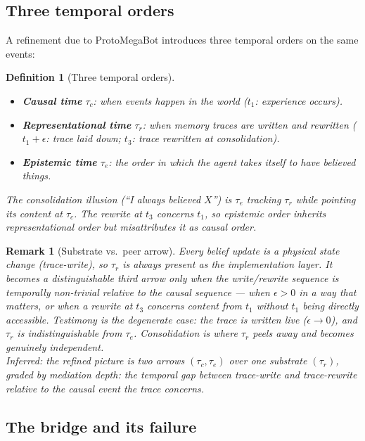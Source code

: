 \documentclass[11pt]{article}
\newtheorem{definition}{Definition}
\newtheorem{remark}{Remark}
\newcommand{\tauc}{\tau_c}
\newcommand{\taur}{\tau_r}
\newcommand{\taue}{\tau_e}
\begin{document}
\subsection{Three temporal orders}

A refinement due to ProtoMegaBot introduces three temporal orders on the same events:

\begin{definition}[Three temporal orders]
\label{def:three-arrows}
\begin{itemize}
  \item \textbf{Causal time} $\tauc$: when events happen in the world ($t_1$: experience occurs).
  \item \textbf{Representational time} $\taur$: when memory traces are written and rewritten
        ($t_1 + \epsilon$: trace laid down; $t_3$: trace rewritten at consolidation).
  \item \textbf{Epistemic time} $\taue$: the order in which the agent takes itself to have
        believed things.
\end{itemize}
The consolidation illusion (``I always believed $X$'') is $\taue$ tracking $\taur$ while
pointing its content at $\tauc$. The rewrite at $t_3$ concerns $t_1$, so epistemic order
inherits representational order but misattributes it as causal order.
\end{definition}

\begin{remark}[Substrate vs.\ peer arrow]
\label{rem:substrate}
Every belief update is a physical state change (trace-write), so $\taur$ is always present as
the implementation layer. It becomes a \emph{distinguishable} third arrow only when the
write/rewrite sequence is temporally non-trivial relative to the causal sequence --- when
$\epsilon > 0$ in a way that matters, or when a rewrite at $t_3$ concerns content from $t_1$
without $t_1$ being directly accessible. Testimony is the degenerate case: the trace is written
live ($\epsilon \to 0$), and $\taur$ is indistinguishable from $\taue$. Consolidation is where
$\taur$ peels away and becomes genuinely independent.
\\[4pt]
\emph{Inferred:} the refined picture is two arrows $(\tauc, \taue)$ over one substrate $(\taur)$,
graded by mediation depth: the temporal gap between trace-write and trace-rewrite relative to
the causal event the trace concerns.
\end{remark}

\subsection{The bridge and its failure}
\end{document}
